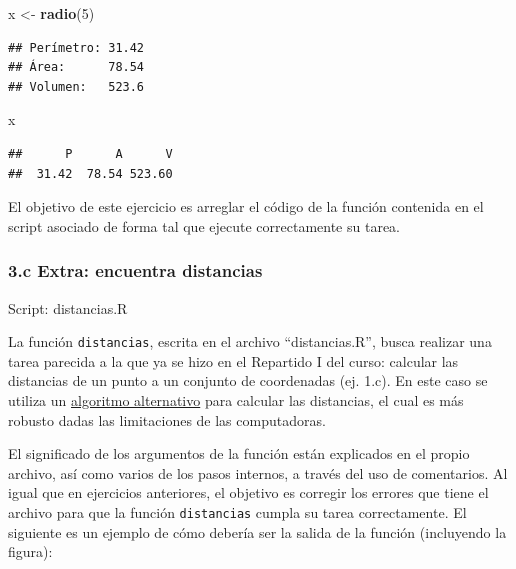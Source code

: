 \documentclass[]{article}
\newenvironment{Shaded}{}{}
\newcommand{\KeywordTok}[1]{\textcolor[rgb]{0.00,0.44,0.13}{\textbf{{#1}}}}
\newcommand{\DecValTok}[1]{\textcolor[rgb]{0.25,0.63,0.44}{{#1}}}
\newcommand{\NormalTok}[1]{{#1}}
\begin{document}
\begin{Shaded}
\begin{Highlighting}[]
\NormalTok{x <- }\KeywordTok{radio}\NormalTok{(}\DecValTok{5}\NormalTok{)}
\end{Highlighting}
\end{Shaded}
\begin{verbatim}
## Perímetro: 31.42 
## Área:      78.54 
## Volumen:   523.6 
\end{verbatim}
\begin{Shaded}
\begin{Highlighting}[]
\NormalTok{x}
\end{Highlighting}
\end{Shaded}
\begin{verbatim}
##      P      A      V 
##  31.42  78.54 523.60 
\end{verbatim}
El objetivo de este ejercicio es arreglar el código de la función
contenida en el script asociado de forma tal que ejecute correctamente
su tarea.

\subsubsection{3.c Extra: encuentra distancias}

Script: distancias.R

La función \texttt{distancias}, escrita en el archivo ``distancias.R'',
busca realizar una tarea parecida a la que ya se hizo en el Repartido I
del curso: calcular las distancias de un punto a un conjunto de
coordenadas (ej. 1.c). En este caso se utiliza un
\href{http://www.johndcook.com/blog/2010/06/02/whats-so-hard-about-finding-a-hypotenuse/}{algoritmo
alternativo} para calcular las distancias, el cual es más robusto dadas
las limitaciones de las computadoras.

El significado de los argumentos de la función están explicados en el
propio archivo, así como varios de los pasos internos, a través del uso
de comentarios. Al igual que en ejercicios anteriores, el objetivo es
corregir los errores que tiene el archivo para que la función
\texttt{distancias} cumpla su tarea correctamente. El siguiente es un
ejemplo de cómo debería ser la salida de la función (incluyendo la
figura):
\end{document}
